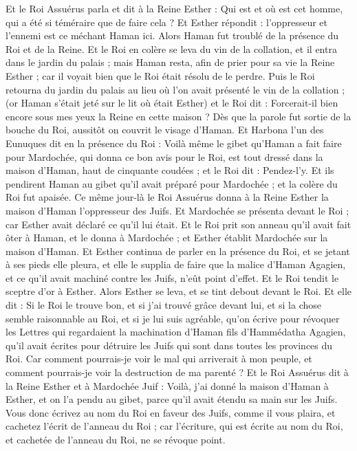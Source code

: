 \begin{multicols}{2}
Et le Roi Assuérus parla et dit à la Reine Esther : Qui est et où est cet homme, qui a été si téméraire que de faire cela ?
Et Esther répondit : l'oppresseur et l'ennemi est ce méchant Haman ici. Alors Haman fut troublé de la présence du Roi et de la Reine.
Et le Roi en colère se leva du vin de la collation, et il entra dans le jardin du palais ; mais Haman resta, afin de prier pour sa vie la Reine Esther ; car il voyait bien que le Roi était résolu de le perdre.
Puis le Roi retourna du jardin du palais au lieu où l'on avait présenté le vin de la collation ; (or Haman s'était jeté sur le lit où était Esther) et le Roi dit : Forcerait-il bien encore sous mes yeux la Reine en cette maison ? Dès que la parole fut sortie de la bouche du Roi, aussitôt on couvrit le visage d'Haman.
Et Harbona l'un des Eunuques dit en la présence du Roi : Voilà même le gibet qu'Haman a fait faire pour Mardochée, qui donna ce bon avis pour le Roi, est tout dressé dans la maison d'Haman, haut de cinquante coudées ; et le Roi dit : Pendez-l'y.
Et ils pendirent Haman au gibet qu'il avait préparé pour Mardochée ; et la colère du Roi fut apaisée.
\VerseOne{}Ce même jour-là le Roi Assuérus donna à la Reine Esther la maison d'Haman l'oppresseur des Juifs. Et Mardochée se présenta devant le Roi ; car Esther avait déclaré ce qu'il lui était.
Et le Roi prit son anneau qu'il avait fait ôter à Haman, et le donna à Mardochée ; et Esther établit Mardochée sur la maison d'Haman.
Et Esther continua de parler en la présence du Roi, et se jetant à ses pieds elle pleura, et elle le supplia de faire que la malice d'Haman Agagien, et ce qu'il avait machiné contre les Juifs, n'eût point d'effet.
Et le Roi tendit le sceptre d'or à Esther. Alors Esther se leva, et se tint debout devant le Roi.
Et elle dit : Si le Roi le trouve bon, et si j'ai trouvé grâce devant lui, et si la chose semble raisonnable au Roi, et si je lui suis agréable, qu'on écrive pour révoquer les Lettres qui regardaient la machination d'Haman fils d'Hammédatha Agagien, qu'il avait écrites pour détruire les Juifs qui sont dans toutes les provinces du Roi.
Car comment pourrais-je voir le mal qui arriverait à mon peuple, et comment pourrais-je voir la destruction de ma parenté ?
Et le Roi Assuérus dit à la Reine Esther et à Mardochée Juif : Voilà, j'ai donné la maison d'Haman à Esther, et on l'a pendu au gibet, parce qu'il avait étendu sa main sur les Juifs.
Vous donc écrivez au nom du Roi en faveur des Juifs, comme il vous plaira, et cachetez l'écrit de l'anneau du Roi ; car l'écriture, qui est écrite au nom du Roi, et cachetée de l'anneau du Roi, ne se révoque point.

\end{multicols}

